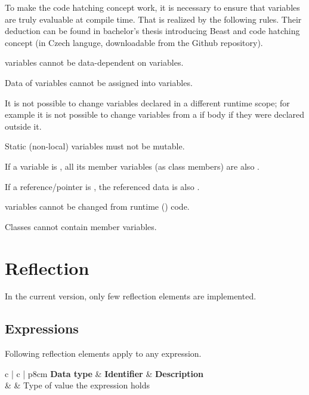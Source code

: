To make the code hatching concept work, it is necessary to ensure that \ctime variables are truly evaluable at compile time. That is realized by the following rules. Their deduction can be found in bachelor's thesis introducing Beast and code hatching concept (in Czech languge, downloadable from the Github repository).
\begin{compactenum}
	\item \ctime variables cannot be data-dependent on \nonctime variables. \nopagebreak
	\begin{compactenum}
		\item Data of \nonctime variables cannot be assigned into \ctime variables.
		\item It is not possible to change \ctime variables declared in a different runtime scope; for example it is not possible to change \ctime variables from a \nonctime if body if they were declared outside it.
	\end{compactenum}
	\item Static (non-local) \ctime variables must not be mutable.
	\item If a variable is \ctime, all its member variables (as class members) are also \ctime.
	\item If a reference/pointer is \ctime, the referenced data is also \ctime.
	\item \ctime variables cannot be changed from runtime (\nonctime) code.
	\item Classes cannot contain member \ctime variables.
\end{compactenum}

\chapter{Reflection} \label{reflection}
In the current version, only few reflection elements are implemented.

\section{Expressions}
Following reflection elements apply to any expression.

\begin{centeredRefTabular}{c | c | p{8cm}}
	\textbf{Data type} & \textbf{Identifier} & \textbf{Description} \\ \hline \hline
	 &  & Type of value the expression holds
\end{centeredRefTabular}

